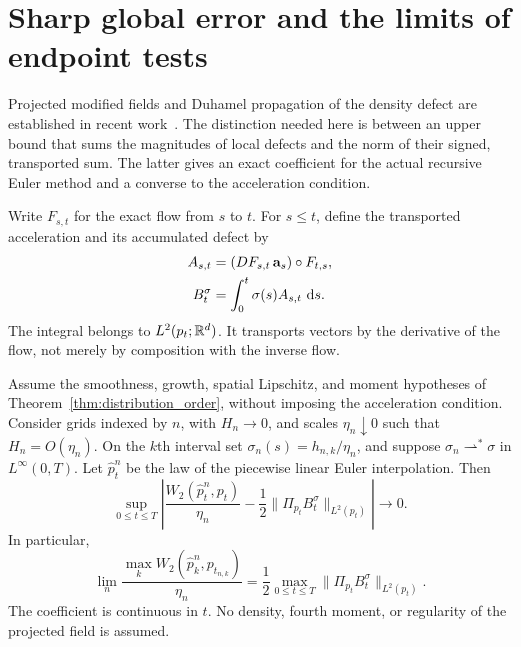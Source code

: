 \section{Sharp global error and the limits of endpoint tests}
\label{sec:sharp-global}

Projected modified fields and Duhamel propagation of the density defect
are established in recent work~\citep{obzherin2026density,obzherin2026finite}.
The distinction needed here is between an upper bound that sums the
magnitudes of local defects and the norm of their signed, transported
sum.  The latter gives an exact coefficient for the actual recursive
Euler method and a converse to the acceleration condition.

Write $F_{s,t}$ for the exact flow from $s$ to $t$.  For $s\le t$, define
the transported acceleration and its accumulated defect by
\begin{align}
 A_{s,t}&=(DF_{s,t}\,\mathbf a_s)\circ F_{t,s},\nonumber\\
 B_t^\sigma&=\int_0^t\sigma(s)A_{s,t}\,\,\mathrm d s.
 \label{eq:transported-global-defect}
\end{align}
The integral belongs to $L^2(p_t;\mathbb R^d)$.  It transports vectors by the
derivative of the flow, not merely by composition with the inverse flow.

\begin{theorem}
\label{thm:sharp-global-euler}
Assume the smoothness, growth, spatial Lipschitz, and moment hypotheses
of Theorem~\ref{thm:distribution_order}, without imposing the acceleration
condition.  Consider grids indexed by $n$, with $H_n\to0$, and scales $\eta_n\downarrow0$
such that $H_n=O(\eta_n)$.  On the $k$th interval set
$\sigma_n(s)=h_{n,k}/\eta_n$, and suppose
$\sigma_n\rightharpoonup^*\sigma$ in $L^\infty(0,T)$.
Let $\widehat p_t^n$ be the law of the piecewise linear Euler
interpolation.  Then
\begin{equation}
 \sup_{0\le t\le T}\left|
 \frac{W_2(\widehat p_t^n,p_t)}{\eta_n}
 -\frac12\|\Pi_{p_t}B_t^\sigma\|_{L^2(p_t)}\right|\longrightarrow0.
 \label{eq:sharp-global-uniform}
\end{equation}
In particular,
\begin{equation}
 \lim_n\frac{\max_kW_2(\widehat p_k^n,p_{t_{n,k}})}{\eta_n}
 =\frac12\max_{0\le t\le T}\|\Pi_{p_t}B_t^\sigma\|_{L^2(p_t)}.
 \label{eq:sharp-global-maximum}
\end{equation}
The coefficient is continuous in $t$.  No density, fourth moment, or
regularity of the projected field is assumed.
\end{theorem}

